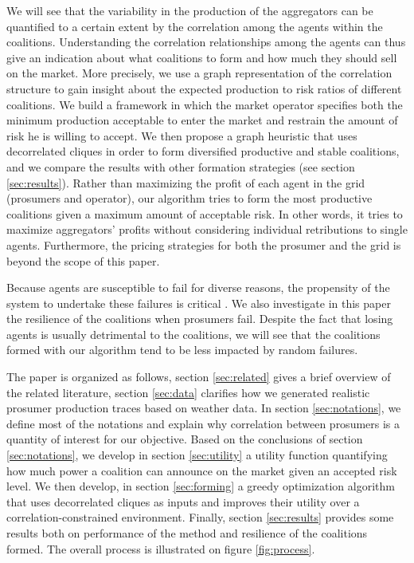 \documentclass[journal]{IEEEtran}
\begin{document}
We will see that the variability in the production of the aggregators can be quantified to a certain extent by the correlation among the agents within the coalitions. Understanding the correlation relationships among the agents can thus give an indication about what coalitions to form and how much they should sell on the market. More precisely, we use a graph representation of the correlation structure to gain insight about the expected production to risk ratios of different coalitions. We build a framework in which the market operator specifies both the minimum production acceptable to enter the market and restrain the amount of risk he is willing to accept. We then propose a graph heuristic that uses decorrelated cliques in order to form diversified productive and stable coalitions, and we compare the results with other formation strategies (see section \ref{sec:results}). Rather than maximizing the profit of each agent in the grid (prosumers and operator), our algorithm tries to form the most productive coalitions given a maximum amount of acceptable risk. In other words, it tries to maximize aggregators' profits without considering individual retributions to single agents. Furthermore, the pricing strategies for both the prosumer and the grid is beyond the scope of this paper.  

Because agents are susceptible to fail for diverse reasons, the propensity of the system to undertake these failures is critical \cite{Pahwa}. We also investigate in this paper the resilience of the coalitions when prosumers fail. Despite the fact that losing agents is usually detrimental to the coalitions, we will see that the coalitions formed with our algorithm tend to be less impacted by random failures.

The paper is organized as follows, section \ref{sec:related} gives a brief overview of the related literature, section \ref{sec:data} clarifies how we generated realistic prosumer production traces based on weather data. In section \ref{sec:notations}, we define most of the notations and explain why correlation between prosumers is a quantity of interest for our objective. Based on the conclusions of section \ref{sec:notations}, we develop in section \ref{sec:utility} a utility function quantifying how much power a coalition can announce on the market given an accepted risk level. We then develop, in section \ref{sec:forming} a greedy optimization algorithm that uses decorrelated cliques as inputs and improves their utility over a correlation-constrained environment. Finally, section \ref{sec:results} provides some results both on performance of the method and resilience of the coalitions formed. The overall process is illustrated on figure \ref{fig:process}.
\end{document}
